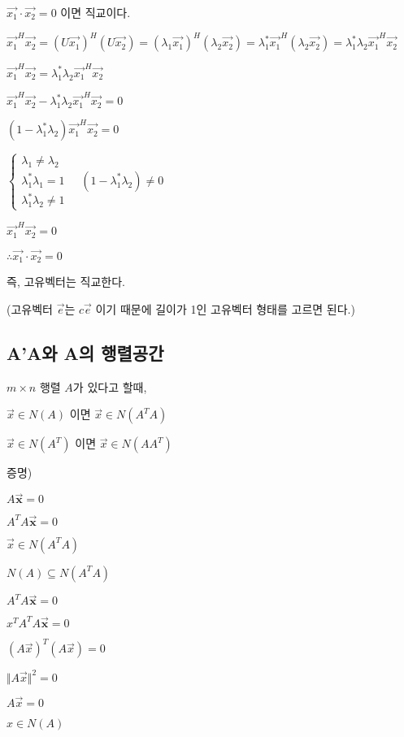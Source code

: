 $\vec{x_1} \cdot \vec{x_2} = 0$ 이면 직교이다.

$\vec{x_1}^H\vec{x_2}= (U\vec{x_1})^H(U\vec{x_2})=(\lambda_1\vec{x_1})^H(\lambda_2\vec{x_2})=\lambda_1^{\ast}\vec{x_1}^H(\lambda_2\vec{x_2})=\lambda_1^{\ast}\lambda_2\vec{x_1}^H\vec{x_2}$

$\vec{x_1}^H\vec{x_2}=\lambda_1^{\ast}\lambda_2\vec{x_1}^H\vec{x_2}$

$\vec{x_1}^H\vec{x_2}-\lambda_1^{\ast}\lambda_2\vec{x_1}^H\vec{x_2}=0$

$(1-\lambda_1^{\ast}\lambda_2)\vec{x_1}^H\vec{x_2}=0$

$\begin{cases} \lambda_1 \ne \lambda_2 \\ \lambda_1^{\ast}\lambda_1=1 \\ \lambda_1^{\ast}\lambda_2\ne 1 \end{cases} \quad (1-\lambda_1^{\ast}\lambda_2) \ne 0$

$\vec{x_1}^H\vec{x_2}=0$

$\therefore \vec{x_1} \cdot \vec{x_2} = 0$

즉, 고유벡터는 직교한다.

(고유벡터 $\vec{e}$는 $c\vec{e}$ 이기 때문에 길이가 1인 고유벡터 형태를 고르면 된다.)


\newpage
\subsection{A'A와 A의 행렬공간}

\begin{theorem}
$m \times n$ 행렬 $A$가 있다고 할때,

$\vec{x} \in N(A)$ 이면 $\vec{x} \in N(A^TA)$

$\vec{x} \in N(A^T)$ 이면 $\vec{x} \in N(AA^T)$
\end{theorem}

증명)

$𝐴\vec{𝐱} = 0$

$𝐴^T𝐴\vec{𝐱} = 0$

$\vec{x} \in N(A^TA)$

$N(A) \subseteq N(A^TA)$



$𝐴^T𝐴\vec{𝐱} = 0$

$x^T𝐴^T𝐴\vec{𝐱} = 0$

$(A\vec{x})^T(A\vec{x}) = 0$

$\Vert A\vec{x} \Vert^2 = 0$

$A\vec{x} = 0$

$x \in N(A)$

